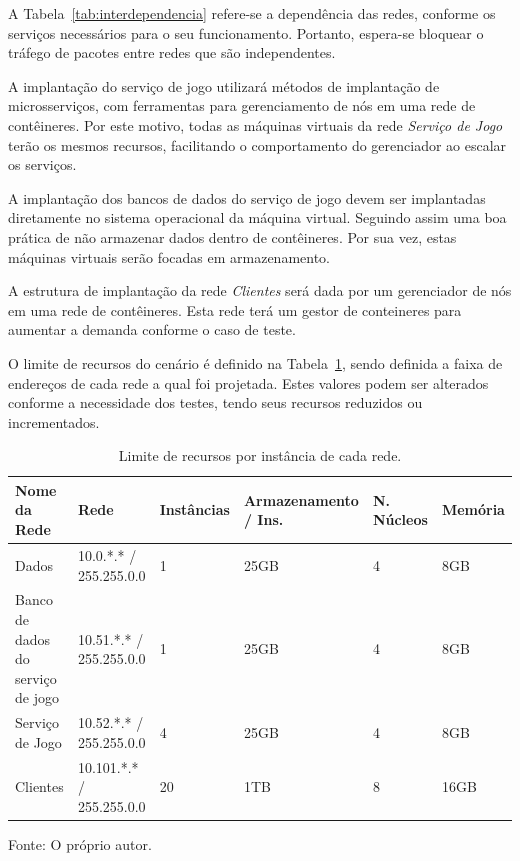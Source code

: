 A Tabela~\ref{tab:interdependencia} refere-se a dependência das redes, conforme os serviços necessários para o seu funcionamento.
%
Portanto, espera-se bloquear o tráfego de pacotes entre redes que são independentes.

A implantação do serviço de jogo utilizará métodos de implantação de microsserviços, com ferramentas para gerenciamento de nós em uma rede de contêineres.
%
Por este motivo, todas as máquinas virtuais da rede \textit{Serviço de Jogo} terão os mesmos recursos, facilitando o comportamento do gerenciador ao escalar os serviços.

A implantação dos bancos de dados do serviço de jogo devem ser implantadas diretamente no sistema operacional da máquina virtual.
%
Seguindo assim uma boa prática de não armazenar dados dentro de contêineres.
%
Por sua vez, estas máquinas virtuais serão focadas em armazenamento.

A estrutura de implantação da rede \textit{Clientes} será dada por um gerenciador de nós em uma rede de contêineres.
%
Esta rede terá um gestor de conteineres para aumentar a demanda conforme o caso de teste.

O limite de recursos do cenário é definido na Tabela~\ref{tab:limite_recursos}, sendo definida a faixa de endereços de cada rede a qual foi projetada.
%
Estes valores podem ser alterados conforme a necessidade dos testes, tendo seus recursos reduzidos ou incrementados.

\begin{table}[htb!]
\centering
\begin{adjustbox}{max width=\textwidth}
\caption{Limite de recursos por instância de cada rede.}
\label{tab:limite_recursos}
\begin{tabular}{|l|l|l|l|l|l|}
\hline
Nome da Rede                      & Rede                     & Instâncias & Armazenamento / Ins. & N. Núcleos & Memória \\ \hline
Dados                             & 10.0.*.* / 255.255.0.0   & 1          & 25GB                & 4          & 8GB     \\ \hline
Banco de dados do serviço de jogo & 10.51.*.* / 255.255.0.0  & 1          & 25GB                & 4          & 8GB     \\ \hline
Serviço de Jogo                   & 10.52.*.* / 255.255.0.0  & 4         & 25GB                 & 4          & 8GB     \\ \hline
Clientes                          & 10.101.*.* / 255.255.0.0 & 20          & 1TB                 & 8          & 16GB     \\ \hline
\end{tabular}
\end{adjustbox}

Fonte: O próprio autor.
\end{table}

